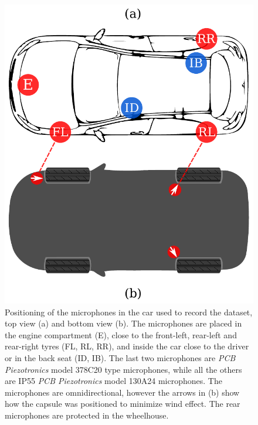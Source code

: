 \begin{figure}[ht]
	\centering
	\includegraphics[width=0.6\linewidth]{img/car-mic}
	\caption[Car equipment for dataset recording.]{Positioning of the microphones in the car used to record the dataset, top view (a) and bottom view (b). The microphones are placed in the engine compartment (E), close to the front-left, rear-left and rear-right tyres (FL, RL, RR), and inside the car close to the driver or in the back seat (ID, IB). The last two microphones are \textit{PCB Piezotronics} model 378C20 type microphones, while all the others are IP55 \textit{PCB Piezotronics} model 130A24 microphones. The microphones are omnidirectional, however the arrows in (b) show how the capsule was positioned to minimize wind effect. The rear microphones are protected in the wheelhouse.}
	\label{fig:car-mic}
\end{figure}

